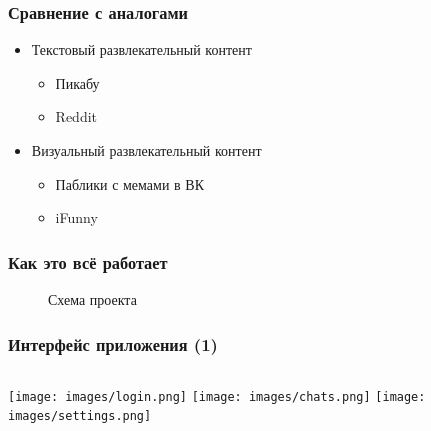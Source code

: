\documentclass[xetex,mathserif,serif, xcolor=table]{beamer}
\begin{document}
	\begin{frame}
		\frametitle{Сравнение с аналогами}
			\begin{itemize}
				\item Текстовый развлекательный контент
					\begin{itemize}
				    	\item Пикабу
				    	\item Reddit
			    	\end{itemize}
			    \item Визуальный развлекательный контент
					\begin{itemize}
				    	\item Паблики с мемами в ВК
				    	\item iFunny
			    	\end{itemize}
			\end{itemize}
	\end{frame}		
	
	\begin{frame}
		\frametitle{Как это всё работает}
		\begin{figure}[h]
            \caption{Схема проекта}
            \label{fig:image}
        \end{figure}
	\end{frame}	
	
	\begin{frame}
		\frametitle{Интерфейс приложения (1)}
            \begin{columns}[t]
                    \texttt{[image: images/login.png]}
                    \texttt{[image: images/chats.png]}
                    \texttt{[image: images/settings.png]}
                    
            \end{columns}
	\end{frame}	
	
\end{document}
